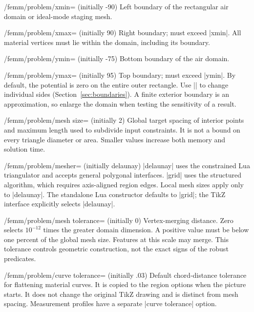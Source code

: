 \begin{key}{/femm/problem/xmin= (initially -90)}
Left boundary of the rectangular air domain or ideal-mode staging mesh.
\end{key}
\begin{key}{/femm/problem/xmax= (initially 90)}
Right boundary; must exceed |xmin|. All material vertices must lie within
the domain, including its boundary.
\end{key}
\begin{key}{/femm/problem/ymin= (initially -75)}
Bottom boundary of the air domain.
\end{key}
\begin{key}{/femm/problem/ymax= (initially 95)}
Top boundary; must exceed |ymin|. By default, the potential is zero on the
entire outer rectangle. Use |\femmboundary| to change individual sides
(Section~\ref{sec:boundaries}). A finite exterior boundary is an approximation,
so enlarge the domain when testing the sensitivity of a result.
\end{key}
\begin{key}{/femm/problem/mesh size= (initially 2)}
Global target spacing of interior points and maximum length used to
subdivide input constraints. It is not a bound on every triangle diameter
or area. Smaller values increase both memory and solution time.
\end{key}
\begin{key}{/femm/problem/mesher= (initially delaunay)}
|delaunay| uses the constrained Lua triangulator and accepts general
polygonal interfaces. |grid| uses the structured algorithm,
which requires axis-aligned region edges. Local mesh sizes apply only to
|delaunay|. The standalone Lua constructor defaults to |grid|; the TikZ interface
explicitly selects |delaunay|.
\end{key}
\begin{key}{/femm/problem/mesh tolerance= (initially 0)}
Vertex-merging distance. Zero selects $10^{-12}$ times the greater domain
dimension. A positive value must be below one percent of the global mesh
size. Features at this scale may merge. This tolerance controls geometric
construction, not the exact signs of the robust predicates.
\end{key}
\begin{key}{/femm/problem/curve tolerance= (initially .03)}
Default chord-distance tolerance for flattening material curves. It is
copied to the region options when the picture starts. It does not change
the original TikZ drawing and is distinct from mesh spacing. Measurement
profiles have a separate |curve tolerance| option.
\end{key}
